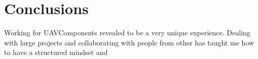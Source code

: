 \section{Conclusions}
Working for UAVComponents revealed to be a very unique experience.
Dealing with large projects and collaborating with people from other  has taught me how to have a structured mindset and 
